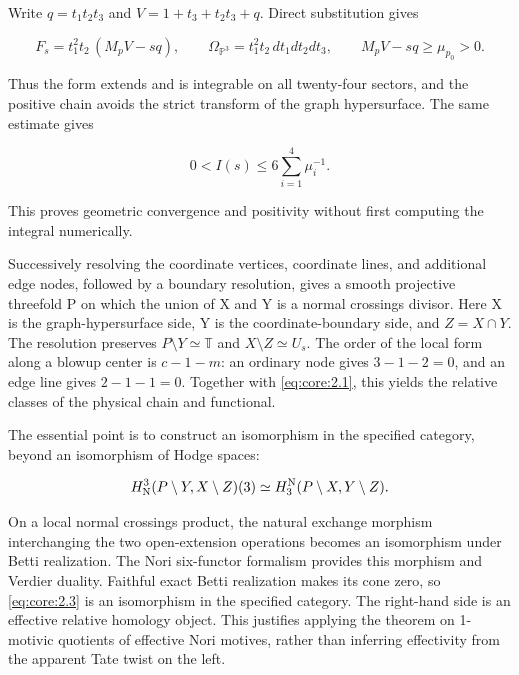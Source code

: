\documentclass[11pt,a4paper,oneside]{article}
\theoremstyle{plain}
\theoremstyle{definition}
\theoremstyle{remark}
\numberwithin{equation}{section}
\begin{document}
Write \(q=t_1t_2t_3\) and \(V=1+t_3+t_2t_3+q\). Direct substitution gives

\begin{equation}
F_s=t_1^2t_2\,(M_pV-sq),\qquad
 \Omega_{\mathbb P^3}=t_1^2t_2\,dt_1dt_2dt_3,
 \qquad M_pV-sq\geq\mu_{p_0}>0.                        \label{eq:core:2.1}
\end{equation}

Thus the form extends and is integrable on all twenty-four sectors, and the positive chain avoids the strict transform of the graph hypersurface. The same estimate gives

\begin{equation}
0<I(s)\leq6\sum_{i=1}^4\mu_i^{-1}.       \label{eq:core:2.2}
\end{equation}

This proves geometric convergence and positivity without first computing the integral numerically.

Successively resolving the coordinate vertices, coordinate lines, and additional edge nodes, followed by a boundary resolution, gives a smooth projective threefold P on which the union of X and Y is a normal crossings divisor. Here X is the graph-hypersurface side, Y is the coordinate-boundary side, and \(Z=X\cap Y\). The resolution preserves \(P\setminus Y\simeq\mathbb T\) and \(X\setminus Z\simeq U_s\). The order of the local form along a blowup center is \(c- 1- m\): an ordinary node gives \(3- 1- 2=0\), and an edge line gives \(2- 1- 1=0\). Together with \eqref{eq:core:2.1}, this yields the relative classes of the physical chain and functional.

The essential point is to construct an isomorphism in the specified category, beyond an isomorphism of Hodge spaces:

\begin{equation}
H^3_{\rm N}(P\setminus Y,X\setminus Z)(3)
       \simeq H^{\rm N}_3(P\setminus X,Y\setminus Z).   \label{eq:core:2.3}
\end{equation}

On a local normal crossings product, the natural exchange morphism interchanging the two open-extension operations becomes an isomorphism under Betti realization. The Nori six-functor formalism provides this morphism and Verdier duality. Faithful exact Betti realization makes its cone zero, so \eqref{eq:core:2.3} is an isomorphism in the specified category. The right-hand side is an effective relative homology object. This justifies applying the theorem on 1-motivic quotients of effective Nori motives, rather than inferring effectivity from the apparent Tate twist on the left.
\end{document}
